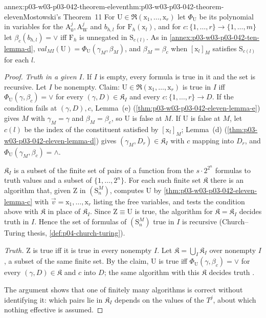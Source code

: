 \begin{annexitem}{annex:p03-w03-p03-042-theorem-eleven}{thm:p03-w03-p03-042-theorem-eleven}{Mostowski's Theorem~11}
For \(\mathrm U\in\mathfrak R(\mathrm x_1,\ldots,\mathrm x_r)\) let
\(\Phi_{\mathrm U}\) be its polynomial in variables for the
\(\mathrm A^j_0,\mathrm A^j_{\mathrm W}\) and \(b_{h,l}\) for \(\mathrm
F_h(\mathrm x_l)\), and for \(c:\{1,\ldots,r\}\to\{1,\ldots,m\}\) let
\(\beta_c(b_{h,l})=\vee\) iff \(\mathrm F_h\) is unnegated in \(\mathrm
S_{c(l)}\).  As in \cref{annex:p03-w03-p03-042-ten-lemma-d},
\(\mathit{val}_{MI}(\mathrm U)=\Phi_{\mathrm U}(\gamma_M,\beta_M)\), and
\(\beta_M=\beta_c\) when \([\mathrm x_l]_M\) satisfies \(\mathrm
S_{c(l)}\) for each \(l\).
\begin{proof}
\emph{Truth in a given \(I\).}  If \(I\) is empty, every formula is true
in it and the set is recursive.  Let \(I\) be nonempty.  Claim:
\(\mathrm U\in\mathfrak R(\mathrm x_1,\ldots,\mathrm x_r)\) is true in
\(I\) iff \(\Phi_{\mathrm U}(\gamma,\beta_c)=\vee\) for every
\((\gamma,D)\in\mathfrak K_I\) and every \(c:\{1,\ldots,r\}\to D\).  If
the condition fails at \((\gamma,D),c\), Lemma~(e)
(\cref{thm:p03-w03-p03-042-eleven-lemma-e}) gives \(M\) with
\(\gamma_M=\gamma\) and \(\beta_M=\beta_c\), so \(\mathrm U\) is false at
\(M\).  If \(\mathrm U\) is false at \(M\), let \(c(l)\) be the index of
the constituent satisfied by \([\mathrm x_l]_M\); Lemma~(d)
(\cref{thm:p03-w03-p03-042-eleven-lemma-d}) gives \((\gamma_M,D_r)\in
\mathfrak K_I\) with \(c\) mapping into \(D_r\), and \(\Phi_{\mathrm U}
(\gamma_M,\beta_c)=\wedge\).

\(\mathfrak K_I\) is a subset of the finite set of pairs of a function
from the \(s\cdot2^{2^n}\) formulas to truth values and a subset of
\(\{1,\ldots,2^n\}\).  For each such finite set \(\mathfrak K\) there is
an algorithm that, given \(\mathrm Z\) in \((\mathrm S^M_n)\), computes
\(\mathrm U\) by \cref{thm:p03-w03-p03-042-eleven-lemma-c} with \(\vec
v=\mathrm x_1,\ldots,\mathrm x_r\) listing the free variables, and tests
the condition above with \(\mathfrak K\) in place of \(\mathfrak K_I\).
Since \(\mathrm Z\equiv\mathrm U\) is true, the algorithm for
\(\mathfrak K=\mathfrak K_I\) decides truth in \(I\).  Hence the set of
formulas of \((\mathrm S^M_n)\) true in \(I\) is recursive (Church--Turing
thesis, \cref{def:p04-church-turing}).

\emph{Truth.}  \(\mathrm Z\) is true iff it is true in every nonempty
\(I\).  Let \(\mathfrak K=\bigcup_I\mathfrak K_I\) over nonempty \(I\), a
subset of the same finite set.  By the claim, \(\mathrm U\) is true iff
\(\Phi_{\mathrm U}(\gamma,\beta_c)=\vee\) for every \((\gamma,D)\in
\mathfrak K\) and \(c\) into \(D\); the same algorithm with this
\(\mathfrak K\) decides truth \cite[p.~35]{Mostowski1957}.

The argument shows that one of finitely many algorithms is correct
without identifying it: which pairs lie in \(\mathfrak K_I\) depends on
the values of the \(T^j\), about which nothing effective is assumed.
\end{proof}
\end{annexitem}

